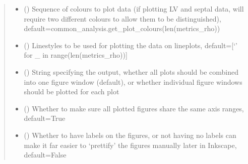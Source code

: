 \documentclass[letterpaper,10pt,english]{sphinxmanual}
\begin{document}
\begin{fulllineitems}
\begin{quote}
\begin{description}
\begin{itemize}
\item {} 
\sphinxAtStartPar
{} (\sphinxstyleliteralemphasis{\sphinxupquote{, }}) \textendash{} Sequence of colours to plot data (if plotting LV and septal data, will require two different colours to allow
them to be distinguished), default=common\_analysis.get\_plot\_colours(len(metrics\_rho))

\item {} 
\sphinxAtStartPar
{} (\sphinxstyleliteralemphasis{\sphinxupquote{, }}) \textendash{} Linestyles to be used for plotting the data on lineplots, default={[}‘\sphinxhyphen{}’ for \_ in range(len(metrics\_rho)){]}

\item {} 
\sphinxAtStartPar
{} (\sphinxstyleliteralemphasis{\sphinxupquote{, }}\sphinxstyleliteralemphasis{\sphinxupquote{, }}) \textendash{} String specifying the output, whether all plots should be combined into one figure window (default), or whether
individual figure windows should be plotted for each plot

\item {} 
\sphinxAtStartPar
{} (\sphinxstyleliteralemphasis{\sphinxupquote{, }}) \textendash{} Whether to make sure all plotted figures share the same axis ranges, default=True

\item {} 
\sphinxAtStartPar
{} (\sphinxstyleliteralemphasis{\sphinxupquote{, }}) \textendash{} Whether to have labels on the figures, or not \sphinxhyphen{} having no labels can make it far easier to ‘prettify’ the
figures manually later in Inkscape, default=False

\end{itemize}


\end{description}
\end{quote}
\end{fulllineitems}
\end{document}
